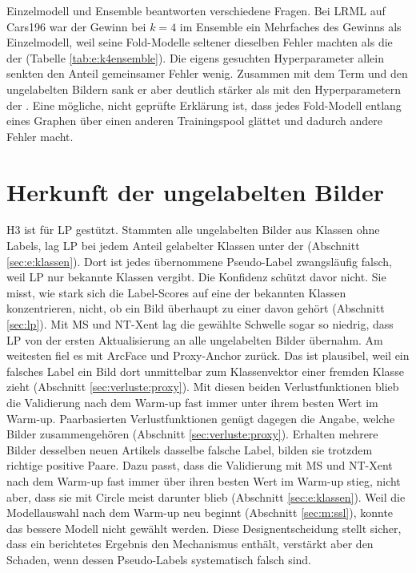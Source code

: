 Einzelmodell und Ensemble beantworten verschiedene Fragen. Bei \ac{LRML} auf Cars196 war der Gewinn bei $k=4$ im Ensemble ein Mehrfaches des Gewinns als Einzelmodell, weil seine Fold-Modelle seltener dieselben Fehler machten als die der \UEBL (Tabelle \ref{tab:e:k4ensemble}). Die eigens gesuchten Hyperparameter allein senkten den Anteil gemeinsamer Fehler wenig. Zusammen mit dem Term und den ungelabelten Bildern sank er aber deutlich stärker als mit den Hyperparametern der \UEBL. Eine mögliche, nicht geprüfte Erklärung ist, dass jedes Fold-Modell entlang eines Graphen über einen anderen Trainingspool glättet und dadurch andere Fehler macht. 

\section{Herkunft der ungelabelten Bilder}
\label{sec:d:herkunft}

H3 ist für \ac{LP} gestützt. Stammten alle ungelabelten Bilder aus Klassen ohne Labels, lag \ac{LP} bei jedem Anteil gelabelter Klassen unter der \UEBL (Abschnitt \ref{sec:e:klassen}). Dort ist jedes übernommene Pseudo-Label zwangsläufig falsch, weil \ac{LP} nur bekannte Klassen vergibt. Die Konfidenz schützt davor nicht. Sie misst, wie stark sich die Label-Scores auf eine der bekannten Klassen konzentrieren, nicht, ob ein Bild überhaupt zu einer davon gehört (Abschnitt \ref{sec:lp}). Mit \ac{MS} und \ac{NT-Xent} lag die gewählte Schwelle sogar so niedrig, dass \ac{LP} von der ersten Aktualisierung an alle ungelabelten Bilder übernahm. Am weitesten fiel es mit ArcFace und Proxy-Anchor zurück. Das ist plausibel, weil ein falsches Label ein Bild dort unmittelbar zum Klassenvektor einer fremden Klasse zieht (Abschnitt \ref{sec:verluste:proxy}). Mit diesen beiden Verlustfunktionen blieb die Validierung nach dem Warm-up fast immer unter ihrem besten Wert im Warm-up. Paarbasierten Verlustfunktionen genügt dagegen die Angabe, welche Bilder zusammengehören (Abschnitt \ref{sec:verluste:proxy}). Erhalten mehrere Bilder desselben neuen Artikels dasselbe falsche Label, bilden sie trotzdem richtige positive Paare. Dazu passt, dass die Validierung mit \ac{MS} und \ac{NT-Xent} nach dem Warm-up fast immer über ihren besten Wert im Warm-up stieg, nicht aber, dass sie mit Circle meist darunter blieb (Abschnitt \ref{sec:e:klassen}). Weil die Modellauswahl nach dem Warm-up neu beginnt (Abschnitt \ref{sec:m:ssl}), konnte das bessere Modell nicht gewählt werden. Diese Designentscheidung stellt sicher, dass ein berichtetes Ergebnis den Mechanismus enthält, verstärkt aber den Schaden, wenn dessen Pseudo-Labels systematisch falsch sind.

